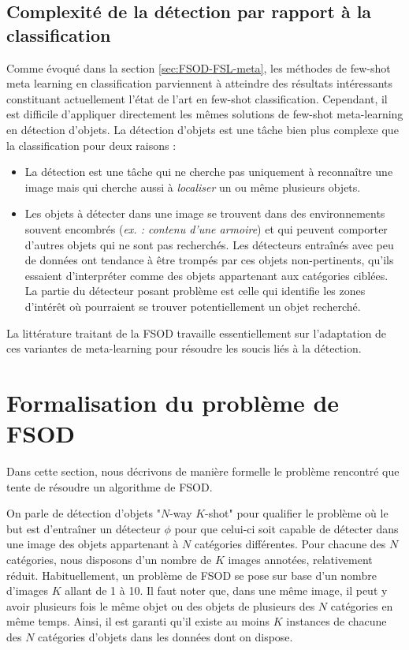 \subsection*{Complexité de la détection par rapport à la classification}
\label{subsec:complexite-detection}
Comme évoqué dans la section \ref{sec:FSOD-FSL-meta}, les méthodes de few-shot meta learning en classification parviennent à atteindre des résultats intéressants constituant actuellement l'état de l'art en few-shot classification. Cependant, il est difficile d'appliquer directement les mêmes solutions de few-shot meta-learning en détection d'objets. La détection d'objets est une tâche bien plus complexe que la classification pour deux raisons :
\begin{itemize}
    \item La détection est une tâche qui ne cherche pas uniquement à reconnaître une image mais qui cherche aussi à \textit{localiser} un ou même plusieurs objets.
    \item Les objets à détecter dans une image se trouvent dans des environnements souvent encombrés (\textit{ex. : contenu d'une armoire}) et qui peuvent comporter d'autres objets qui ne sont pas recherchés. Les détecteurs entraînés avec peu de données ont tendance à être trompés par ces objets non-pertinents, qu'ils essaient d'interpréter comme des objets appartenant aux catégories ciblées. La partie du détecteur posant problème est celle qui identifie les zones d'intérêt où pourraient se trouver potentiellement un objet recherché. 
\end{itemize}

La littérature traitant de la FSOD travaille essentiellement sur l'adaptation de ces variantes de meta-learning pour résoudre les soucis liés à la détection.

\section{Formalisation du problème de FSOD}
\label{sec:FSOD-def-prob}
Dans cette section, nous décrivons de manière formelle le problème rencontré que tente de résoudre un algorithme de FSOD.

On parle de détection d'objets "$N$-way $K$-shot" pour qualifier le problème où le but est d'entraîner un détecteur $\phi$ pour que celui-ci soit capable de détecter dans une image des objets appartenant à $N$ catégories différentes. Pour chacune des $N$ catégories, nous disposons d'un nombre de $K$ images annotées, relativement réduit. Habituellement, un problème de FSOD se pose sur base d'un nombre d'images $K$ allant de 1 à 10. Il faut noter que, dans une même image, il peut y avoir plusieurs fois le même objet ou des objets de plusieurs des $N$ catégories en même temps. Ainsi, il est garanti qu'il existe au moins $K$ instances de chacune des $N$ catégories d'objets dans les données dont on dispose.


